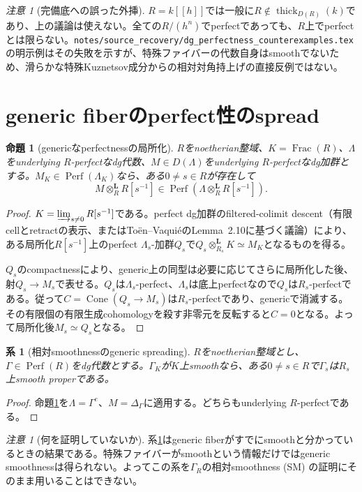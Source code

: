 \documentclass[a4paper,11pt]{ltjsarticle}
\newtheorem{proposition}[theorem]{命題}
\newtheorem{corollary}[theorem]{系}
\theoremstyle{remark}
\newtheorem{remark}[theorem]{注意}
\newcommand{\Perf}{\operatorname{Perf}}
\newcommand{\Cone}{\operatorname{Cone}}
\newcommand{\thick}{\operatorname{thick}}
\newcommand{\otL}{\otimes^{\mathbf L}}
\begin{document}
\begin{remark}[完備底への誤った外挿]
$R=k[[h]]$では一般に$R\notin\thick_{D(R)}(k)$であり、上の議論は使えない。全ての$R/(h^n)$でperfectであっても、$R$上でperfectとは限らない。\texttt{notes/source\_recovery/dg\_perfectness\_counterexamples.tex}の明示例はその失敗を示すが、特殊ファイバーの代数自身はsmoothでないため、滑らかな特殊Kuznetsov成分からの相対対角持上げの直接反例ではない。
\end{remark}

\section{generic fiberのperfect性のspread}
\begin{proposition}[genericなperfectnessの局所化]\label{prop:spread}
$R$をnoetherian整域、$K=\operatorname{Frac}(R)$、$\Lambda$をunderlying $R$-perfectなdg代数、$M\in D(\Lambda)$をunderlying $R$-perfectなdg加群とする。$M_K\in\Perf(\Lambda_K)$なら、ある$0\neq s\in R$が存在して
\[
 M\otL_RR[s^{-1}]\in\Perf(\Lambda\otL_RR[s^{-1}]).
\]
\end{proposition}
\begin{proof}
$K=\varinjlim_{s\neq0}R[s^{-1}]$である。perfect dg加群のfiltered-colimit descent（有限cellとretractの表示、またはToën--VaquiéのLemma~2.10に基づく議論）により、ある局所化$R[s^{-1}]$上のperfect $\Lambda_s$-加群$Q_s$で$Q_s\otL_{R_s}K\simeq M_K$となるものを得る。

$Q_s$のcompactnessにより、generic上の同型は必要に応じてさらに局所化した後、射$Q_s\to M_s$で表せる。$Q_s$は$\Lambda_s$-perfect、$\Lambda_s$は底上perfectなので$Q_s$は$R_s$-perfectである。従って$C=\Cone(Q_s\to M_s)$は$R_s$-perfectであり、genericで消滅する。その有限個の有限生成cohomologyを殺す非零元を反転すると$C=0$となる。よって局所化後$M_s\simeq Q_s$となる。
\end{proof}

\begin{corollary}[相対smoothnessのgeneric spreading]\label{cor:spread}
$R$をnoetherian整域とし、$\Gamma\in\Perf(R)$をdg代数とする。$\Gamma_K$が$K$上smoothなら、ある$0\neq s\in R$で$\Gamma_s$は$R_s$上smooth properである。
\end{corollary}
\begin{proof}
命題\ref{prop:spread}を$\Lambda=\Gamma^e$、$M=\Delta_\Gamma$に適用する。どちらもunderlying $R$-perfectである。
\end{proof}

\begin{remark}[何を証明していないか]\label{rem:not-open}
系\ref{cor:spread}はgeneric fiberがすでにsmoothと分かっているときの結果である。特殊ファイバーがsmoothという情報だけではgeneric smoothnessは得られない。よってこの系を$\Gamma_R$の相対smoothness (SM) の証明にそのまま用いることはできない。
\end{remark}
\end{document}
